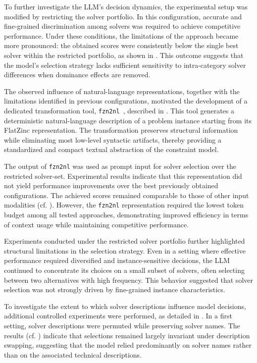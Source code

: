 \documentclass[../../main]{subfiles}
\begin{document}
To further investigate the LLM's decision dynamics, the experimental setup was modified by restricting the solver portfolio. In this configuration, accurate and fine-grained discrimination among solvers was required to achieve competitive performance. Under these conditions, the limitations of the approach became more pronounced: the obtained scores were consistently below the single best solver within the restricted portfolio, as shown in . This outcome suggests that the model's selection strategy lacks sufficient sensitivity to intra-category solver differences when dominance effects are removed.

The observed influence of natural-language representations, together with the limitations identified in previous configurations, motivated the development of a dedicated transformation tool, \texttt{fzn2nl}~\cite{fzn2nl}, described in . This tool generates a deterministic natural-language description of a problem instance starting from its FlatZinc representation. The transformation preserves structural information while eliminating most low-level syntactic artifacts, thereby providing a standardized and compact textual abstraction of the constraint model.

The output of \texttt{fzn2nl} was used as prompt input for solver selection over the restricted solver-set. Experimental results indicate that this representation did not yield performance improvements over the best previously obtained configurations. The achieved scores remained comparable to those of other input modalities (cf. ). However, the \texttt{fzn2nl} representation required the lowest token budget among all tested approaches, demonstrating improved efficiency in terms of context usage while maintaining competitive performance. 

Experiments conducted under the restricted solver portfolio further highlighted structural limitations in the selection strategy. Even in a setting where effective performance required diversified and instance-sensitive decisions, the LLM continued to concentrate its choices on a small subset of solvers, often selecting between two alternatives with high frequency. This behavior suggested that solver selection was not strongly driven by fine-grained instance characteristics.

To investigate the extent to which solver descriptions influence model decisions, additional controlled experiments were performed, as detailed in . In a first setting, solver descriptions were permuted while preserving solver names. The results (cf. ) indicate that selections remained largely invariant under description swapping, suggesting that the model relied predominantly on solver names rather than on the associated technical descriptions.
\end{document}
